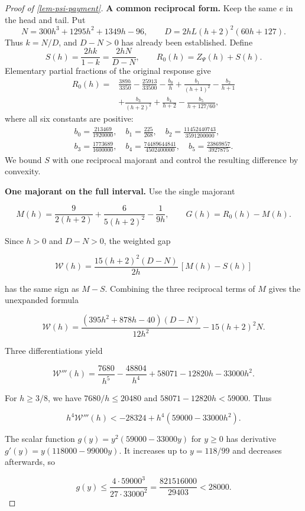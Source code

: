 \documentclass[11pt,a4paper]{article}
\theoremstyle{proofmanuscript}
\begin{document}
\begin{proof}[Proof of \ref{lem-psi-payment}]
\textbf{A common reciprocal form.} Keep the same \(e\) in the head and tail. Put \[
N=300h^3+1295h^2+1349h-96,\qquad
D=2hL(h+2)^2(60h+127).
\] Thus \(k=N/D\), and \(D-N>0\) has already been established. Define \[
S(h)=\frac{2hk}{1-k}=\frac{2hN}{D-N},\qquad R_0(h)=Z_\Psi(h)+S(h).
\] Elementary partial fractions of the original response give \[
\begin{aligned}
R_0(h)={}&\frac{389h}{3350}-\frac{25913}{33500}
-\frac{b_0}{h}+\frac{b_1}{(h+1)^2}-\frac{b_2}{h+1}\\
&+\frac{b_3}{(h+2)^2}+\frac{b_4}{h+2}-\frac{b_5}{h+127/60},
\end{aligned}
\tag{T.3.1}
\] where all six constants are positive: \[
\begin{gathered}
b_0=\frac{213469}{1920000},\quad b_1=\frac{225}{268},\quad
b_2=\frac{11452440743}{3591200000},\\
b_3=\frac{1773689}{1600000},\quad
b_4=\frac{74489644841}{4502400000},\quad
b_5=\frac{23869857}{3927875}.
\end{gathered}
\] We bound \(S\) with one reciprocal majorant and control the resulting difference by convexity.

\textbf{One majorant on the full interval.} Use the single majorant

\[
M(h)=\frac9{2(h+2)}+\frac6{5(h+2)^2}-\frac1{9h},\qquad G(h)=R_0(h)-M(h).
\]

Since \(h>0\) and \(D-N>0\), the weighted gap

\[
\mathcal W(h)=\frac{15(h+2)^2(D-N)}{2h}\,[M(h)-S(h)]
\]

has the same sign as \(M-S\). Combining the three reciprocal terms of \(M\) gives the unexpanded formula

\[
\mathcal W(h)=\frac{(395h^2+878h-40)(D-N)}{12h^2}
-15(h+2)^2N.
\]

Three differentiations yield

\[
\mathcal W'''(h)=\frac{7680}{h^5}-\frac{48804}{h^4}
+58071-12820h-33000h^2.
\]

For \(h\ge3/8\), we have \(7680/h\le20480\) and \(58071-12820h<59000\). Thus

\[
h^4\mathcal W'''(h)<-28324+h^4(59000-33000h^2).
\]

The scalar function \(g(y)=y^2(59000-33000y)\) for \(y\ge0\) has derivative \(g'(y)=y(118000-99000y)\). It increases up to \(y=118/99\) and decreases afterwards, so

\[
g(y)\le\frac{4\cdot59000^3}{27\cdot33000^2}
=\frac{821516000}{29403}<28000.
\]


\end{proof}
\end{document}
